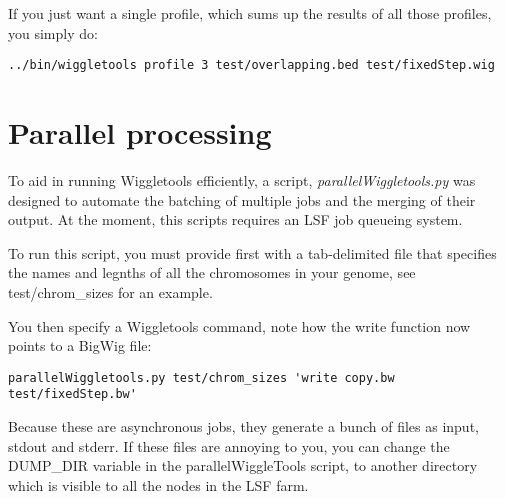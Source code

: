 \documentclass[12pt]{article}
\begin{document}
If you just want a single profile, which sums up the results of all those profiles, you simply do:

\begin{verbatim}
../bin/wiggletools profile 3 test/overlapping.bed test/fixedStep.wig
\end{verbatim}

\section{Parallel processing}

To aid in running Wiggletools efficiently, a script, \emph{parallelWiggletools.py} was designed to automate the batching of multiple jobs and the merging of their output. At the moment, this scripts requires an LSF job queueing system.

To run this script, you must provide first with a tab-delimited file that specifies the names and legnths of all the chromosomes in your genome, see test/chrom\_sizes for an example.

You then specify a Wiggletools command, note how the write function now points to a BigWig file:

\begin{verbatim}
parallelWiggletools.py test/chrom_sizes 'write copy.bw test/fixedStep.bw'
\end{verbatim}

Because these are asynchronous jobs, they generate a bunch of files as input, stdout and stderr. If these files are annoying to you, you can change the DUMP\_DIR variable in the parallelWiggleTools script, to another directory which is visible to all the nodes in the LSF farm.
\end{document}
